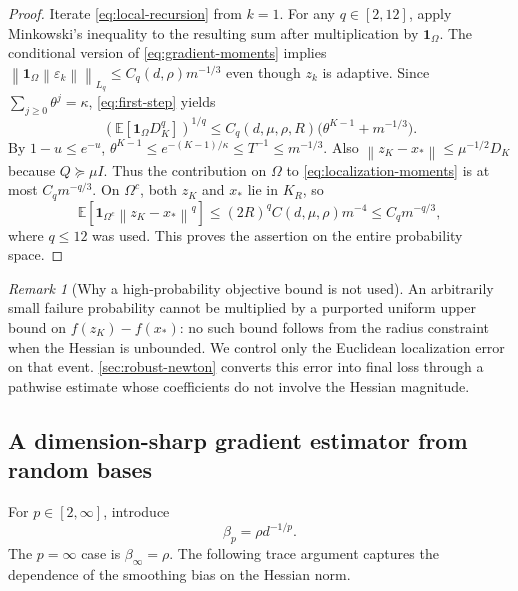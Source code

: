 \documentclass[11pt,a4paper]{article}
\newcommand{\E}{\mathbb E}
\newcommand{\norm}[1]{\left\lVert#1\right\rVert}
\theoremstyle{definition}
\theoremstyle{remark}
\newtheorem{remark}[theorem]{Remark}
\begin{document}
\begin{proof}
Iterate \eqref{eq:local-recursion} from $k=1$. For any $q\in[2,12]$, apply Minkowski's inequality to the resulting sum after multiplication by $\mathbf1_\Omega$. The conditional version of \eqref{eq:gradient-moments} implies
$\norm{\mathbf1_\Omega\norm{\varepsilon_k}}_{L_q}\le C_q(d,\rho)m^{-1/3}$ even though $z_k$ is adaptive.
Since $\sum_{j\ge0}\theta^j=\kappa$, \eqref{eq:first-step} yields
\begin{equation}\label{eq:good-local}
 \left(\E[\mathbf1_\Omega D_K^q]\right)^{1/q}
 \le C_q(d,\mu,\rho,R)\big(\theta^{K-1}+m^{-1/3}\big).
\end{equation}
By $1-u\le e^{-u}$,
$\theta^{K-1}\le e^{-(K-1)/\kappa}\le T^{-1}\le m^{-1/3}$.
Also $\norm{z_K-x_*}\le\mu^{-1/2}D_K$ because $Q\succeq\mu I$.
Thus the contribution on $\Omega$ to \eqref{eq:localization-moments} is at most $C_qm^{-q/3}$.
On $\Omega^c$, both $z_K$ and $x_*$ lie in $K_R$, so
\[
 \E[\mathbf1_{\Omega^c}\norm{z_K-x_*}^q]
 \le(2R)^q C(d,\mu,\rho)m^{-4}
 \le C_qm^{-q/3},
\]
where $q\le12$ was used. This proves the assertion on the entire probability space.
\end{proof}

\begin{remark}[Why a high-probability objective bound is not used]
An arbitrarily small failure probability cannot be multiplied by a purported uniform upper bound on $f(z_K)-f(x_*)$: no such bound follows from the radius constraint when the Hessian is unbounded. We control only the Euclidean localization error on that event. \cref{sec:robust-newton} converts this error into final loss through a pathwise estimate whose coefficients do not involve the Hessian magnitude.
\end{remark}

\subsection{A dimension-sharp gradient estimator from random bases}
\label{sec:bases}
For $p\in[2,\infty]$, introduce
\begin{equation}\label{eq:beta}
 \beta_p=\rho d^{-1/p}.
\end{equation}
The $p=\infty$ case is $\beta_\infty=\rho$.
The following trace argument captures the dependence of the smoothing bias on the Hessian norm.
\end{document}
